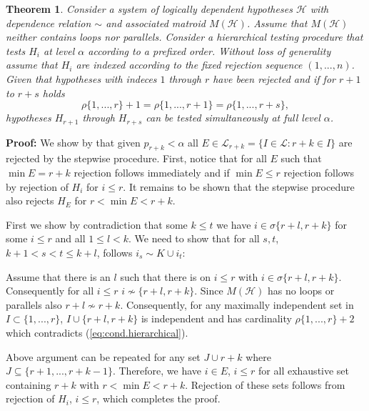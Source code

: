 \documentclass[a4paper,12pt]{article}
\newtheorem{theorem}{Theorem}
\newenvironment{proof}[1][Proof]{\noindent\textbf{#1:} }{}
\begin{document}
\begin{theorem}
  Consider a system of logically dependent hypotheses $\mathscr{H}$
  with dependence relation $\sim$ and associated matroid
  $M(\mathscr{H})$. Assume that $M(\mathscr{H})$ neither contains
  loops nor parallels. Consider a hierarchical testing procedure that
  tests $H_{i}$ at level $\alpha$ according to a prefixed
  order. Without loss of generality assume that $H_i$ are indexed
  according to the fixed rejection sequence $(1,...,n)$. Given 
  that hypotheses with indeces $1$ through $r$ have been
  rejected and if for $r+1$ to $r+s$ holds
  \begin{equation}
    \label{eq:cond.hierarchical}
    \rho \{1,...,r\} + 1 = \rho \{1,...,r+1\} = \rho \{1,...,r+s\},
  \end{equation}
  hypotheses $H_{r+1}$ through $H_{r+s}$ can be tested simultaneously
  at full level $\alpha$.
\end{theorem}

\begin{proof}
  We show by that given $p_{r+k} < \alpha$ all $E \in \mathscr{L}_{r+k} =
  \{I \in \mathscr{L}: r+k \in I\}$ are rejected by the stepwise
  procedure. First, notice that for all $E$ such that $\min E = r+k$
  rejection follows immediately and if $\min E \leq r$ rejection
  follows by rejection of $H_i$ for $i \leq r$. It remains to be shown
  that the stepwise procedure also rejects $H_E$ for $r < \min E <
  r+k$. 

  First we show by contradiction that some $k \leq t$ we have $i \in
  \sigma \{r+l,r+k\}$ for some $i \leq r$ and all $1 \leq l < k$.  We
  need to show that for all $s,t$, $k+1 < s < t \leq k+l$, follows
  $i_s \sim K \cup i_t$:

  Assume that there is an $l$ such that there is on $i \leq r$ with $i
  \in \sigma \{r+l,r+k\}$. Consequently for all $i \leq r$ $i \nsim
  \{r+l,r+k\}$. Since $M(\mathscr{H})$ has no loops or parallels also
  $r+l \nsim r+k$. Consequently, for any maximally independent set in
  $I \subset \{1,...,r\}$, $I \cup \{r+l, r+k\}$ is independent and
  has cardinality $\rho\{1,...,r\}+2$ which contradicts
  (\ref{eq:cond.hierarchical}). 

  Above argument can be repeated for any set $J \cup r+k$ where $J
  \subseteq \{r+1,...,r+k-1\}$. Therefore, we have $i \in E$, $i \leq
  r$ for all exhaustive set containing $r+k$ with $r < \min E <
  r+k$. Rejection of these sets follows from rejection of $H_i$, $i
  \leq r$, which completes the proof. 
\end{proof}
\end{document}
